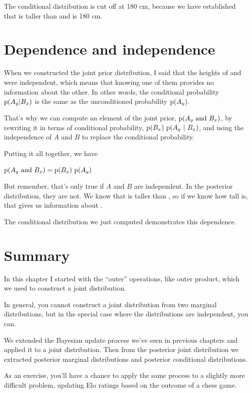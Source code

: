 \documentclass[12pt]{book}
\theoremstyle{exercise}
\begin{document}
The conditional distribution is cut off at 180 cm, because we have established that  is taller than  and  is 180 cm.

\section{Dependence and independence}

When we constructed the joint prior distribution, I said that the heights of  and  were independent, which means that knowing one of them provides no information about the other.
In other words, the conditional probability $\mathrm{p}(A_y | B_x)$ is the same as the unconditioned probability $\mathrm{p}(A_y)$.

That's why we can compute an element of the joint prior, $\mathrm{p}(A_y~\mathrm{and}~B_x)$, by rewriting it in terms of conditional probability, $\mathrm{p}(B_x)~\mathrm{p}(A_y~|~B_x)$, and using the independence of $A$ and $B$ to replace the conditional probability.

Putting it all together, we have

$\mathrm{p}(A_y~\mathrm{and}~B_x) = \mathrm{p}(B_x)~\mathrm{p}(A_y)$

But remember, that's only true if $A$ and $B$ are independent.  
In the posterior distribution, they are not.  
We know that  is taller than , so if we know how tall  is, that gives us information about .

The conditional distribution we just computed demonstrates this dependence.


\section{Summary}

In this chapter I started with the ``outer'' operations, like outer product, which we used to construct a joint distribution.

In general, you cannot construct a joint distribution from two marginal distributions, but in the special case where the distributions are independent, you can.

We extended the Bayesian update process we've seen in previous chapters and applied it to a joint distribution.  Then from the posterior joint distribution we extracted posterior marginal distributions and posterior conditional distributions.

As an exercise, you'll have a chance to apply the same process to a slightly more difficult problem, updating Elo ratings based on the outcome of a chess game.
\end{document}
